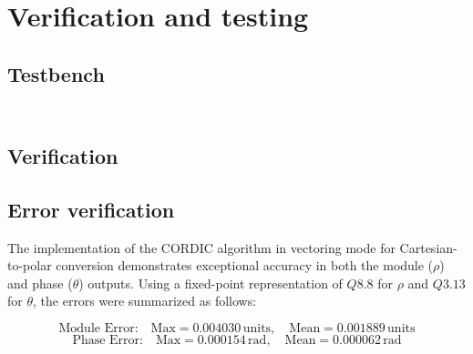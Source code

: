 \chapter{Verification and testing}

\section{Testbench}



\begin{code}
    \inputminted{vhdl}{listings/04/CORDIC_tb.vhd}
    \label{code:testbench}
\end{code}

\begin{code}
    \inputminted{vhdl}{listings/04/GRAPH_tb.vhd}
    \label{code:testbench_graph}
\end{code}

\section{Verification}

\section{Error verification}
The implementation of the CORDIC algorithm in vectoring mode for Cartesian-to-polar conversion demonstrates 
exceptional accuracy in both the module (\( \rho \)) and phase (\( \theta \)) outputs. Using a fixed-point 
representation of \( Q8.8 \) for \( \rho \) and \( Q3.13 \) for \( \theta \), the errors were summarized as follows:

\[
\text{Module Error:} \quad \text{Max} = 0.004030 \, \text{units}, \quad \text{Mean} = 0.001889 \, \text{units}
\]
\[
\text{Phase Error:} \quad \text{Max} = 0.000154 \, \text{rad}, \quad \text{Mean} = 0.000062 \, \text{rad}
\]

